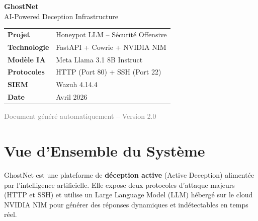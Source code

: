 \documentclass[12pt,a4paper]{article}
\begin{document}
\begin{titlepage}
\begin{center}
\vspace*{2cm}

{\Huge\bfseries\textcolor{ghostblue}{GhostNet}}\\[0.5cm]
{\Large\textcolor{ghostgray}{AI-Powered Deception Infrastructure}}\\[2cm]


\vspace{2cm}

\begin{tabular}{ll}
    \textbf{Projet} & Honeypot LLM -- Sécurité Offensive \\
    \textbf{Technologie} & FastAPI + Cowrie + NVIDIA NIM \\
    \textbf{Modèle IA} & Meta Llama 3.1 8B Instruct \\
    \textbf{Protocoles} & HTTP (Port 80) + SSH (Port 22) \\
    \textbf{SIEM} & Wazuh 4.14.4 \\
    \textbf{Date} & Avril 2026 \\
\end{tabular}

\vfill
{\small\textcolor{gray}{Document généré automatiquement -- Version 2.0}}
\end{center}
\end{titlepage}

\tableofcontents
\newpage

\section{Vue d'Ensemble du Système}

GhostNet est une plateforme de \textbf{déception active} (Active Deception) alimentée par l'intelligence artificielle. Elle expose deux protocoles d'attaque majeurs (HTTP et SSH) et utilise un Large Language Model (LLM) hébergé sur le cloud NVIDIA NIM pour générer des réponses dynamiques et indétectables en temps réel.
\end{document}
